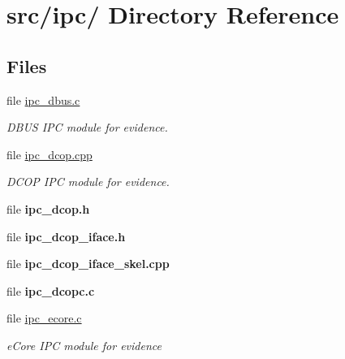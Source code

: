 \hypertarget{dir_000031}{
\section{src/ipc/ Directory Reference}
\label{dir_000031}
}
\subsection*{Files}
\begin{CompactItemize}
\item 
file \hyperlink{ipc__dbus_8c}{ipc\_\-dbus.c}
\begin{CompactList}\small\item\em DBUS IPC module for evidence. \item\end{CompactList}

\item 
file \hyperlink{ipc__dcop_8cpp}{ipc\_\-dcop.cpp}
\begin{CompactList}\small\item\em DCOP IPC module for evidence. \item\end{CompactList}

\item 
file {\bf ipc\_\-dcop.h}
\item 
file {\bf ipc\_\-dcop\_\-iface.h}
\item 
file {\bf ipc\_\-dcop\_\-iface\_\-skel.cpp}
\item 
file {\bf ipc\_\-dcopc.c}
\item 
file \hyperlink{ipc__ecore_8c}{ipc\_\-ecore.c}
\begin{CompactList}\small\item\em e\-Core IPC module for evidence \item\end{CompactList}

\end{CompactItemize}
